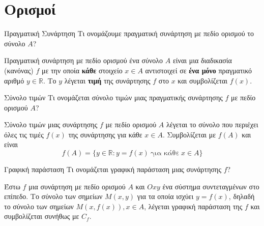 \section{Ορισμοί}
\begin{Orismosbox}{Πραγματική Συνάρτηση}
\label{orismos:pragmatikh_synarthsh}
Τι ονομάζουμε πραγματική συνάρτηση με πεδίο ορισμού το σύνολο $A$?
\end{Orismosbox}\apanthsh
Πραγματική συνάρτηση με πεδίο ορισμού ένα σύνολο $ A $ είναι μια διαδικασία (κανόνας) $f$ με την οποία \textbf{κάθε} στοιχείο $ x\in A $ αντιστοιχεί σε \textbf{ένα μόνο} πραγματικό αριθμό $ y\in\mathbb{R} $. Το $ y $ λέγεται \textbf{τιμή} της συνάρτησης $ f $ στο $ x $ και συμβολίζεται $ f(x) $.
\begin{center}
\centering
{}
\end{center}
\begin{Orismosbox}{Σύνολο τιμών}
\label{orismos:synolo_timwn}
Τι ονομάζεται σύνολο τιμών μιας πραγματικής συνάρτησης $f$ με πεδίο ορισμού $A$?
\end{Orismosbox}
\apanthsh
Σύνολο τιμών μιας συνάρτησης $ f $ με πεδίο ορισμού $ A $ λέγεται το σύνολο που περιέχει όλες τις τιμές $ f(x) $ της συνάρτησης για κάθε  $ x\in A $. Συμβολίζεται με $ f(A) $ και είναι
\[ f(A)=\{y\in\mathbb{R}:y=f(x)\ \textrm{για κάθε}\ x\in A\} \]
\begin{Orismosbox}{Γραφική παράσταση}
\label{orismos:grafikh_parastash}
Τι ονομάζεται γραφική παράσταση μιας συνάρτησης $f$?
\end{Orismosbox}
\apanthsh
Έστω $f$ μια συνάρτηση με πεδίο ορισμού $A$ και $Oxy$ ένα σύστημα συντεταγμένων στο επίπεδο. Το σύνολο των σημείων $M(x, y)$ για τα οποία ισχύει $y = f(x)$, δηλαδή το σύνολο των σημείων $M(x, f(x)), x\in A$, λέγεται γραφική παράσταση της $f$ και συμβολίζεται συνήθως με $C_f$.
